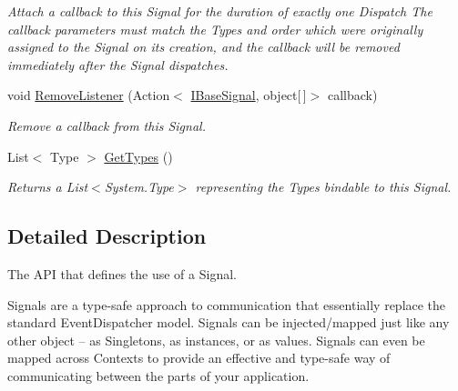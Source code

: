 \begin{DoxyCompactItemize}
\begin{DoxyCompactList}\small\item\em Attach a callback to this Signal for the duration of exactly one Dispatch The callback parameters must match the Types and order which were originally assigned to the Signal on its creation, and the callback will be removed immediately after the Signal dispatches. \end{DoxyCompactList}\item 
\hypertarget{interfacestrange_1_1extensions_1_1signal_1_1api_1_1_i_base_signal_a5a3d3d93779f80693a767fd4a1040954}{void \hyperlink{interfacestrange_1_1extensions_1_1signal_1_1api_1_1_i_base_signal_a5a3d3d93779f80693a767fd4a1040954}{Remove\-Listener} (Action$<$ \hyperlink{interfacestrange_1_1extensions_1_1signal_1_1api_1_1_i_base_signal}{I\-Base\-Signal}, object\mbox{[}$\,$\mbox{]}$>$ callback)}\label{interfacestrange_1_1extensions_1_1signal_1_1api_1_1_i_base_signal_a5a3d3d93779f80693a767fd4a1040954}

\begin{DoxyCompactList}\small\item\em Remove a callback from this Signal. \end{DoxyCompactList}\item 
\hypertarget{interfacestrange_1_1extensions_1_1signal_1_1api_1_1_i_base_signal_aa67779e6ccb87c8c6cebe4583ce4f438}{List$<$ Type $>$ \hyperlink{interfacestrange_1_1extensions_1_1signal_1_1api_1_1_i_base_signal_aa67779e6ccb87c8c6cebe4583ce4f438}{Get\-Types} ()}\label{interfacestrange_1_1extensions_1_1signal_1_1api_1_1_i_base_signal_aa67779e6ccb87c8c6cebe4583ce4f438}

\begin{DoxyCompactList}\small\item\em Returns a List$<$\-System.\-Type$>$ representing the Types bindable to this Signal. \end{DoxyCompactList}\end{DoxyCompactItemize}


\subsection{Detailed Description}
The A\-P\-I that defines the use of a Signal. 

Signals are a type-\/safe approach to communication that essentially replace the standard Event\-Dispatcher model. Signals can be injected/mapped just like any other object -- as Singletons, as instances, or as values. Signals can even be mapped across Contexts to provide an effective and type-\/safe way of communicating between the parts of your application.

